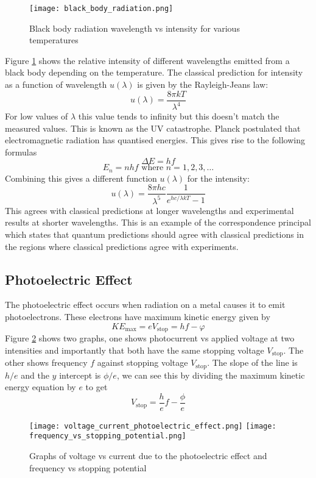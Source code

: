 \documentclass{article}
\begin{document}
    \begin{figure}[ht]
        \centering
        \texttt{[image: black\_body\_radiation.png]}
        \caption{Black body radiation wavelength vs intensity for various temperatures}
        \label{fig:black body wavelength vs frequency}
    \end{figure}
    Figure \ref{fig:black body wavelength vs frequency} shows the relative intensity of different wavelengths emitted from a black body depending on the temperature.
    The classical prediction for intensity as a function of wavelength \(u(\lambda)\) is given by the Rayleigh-Jeans law:
    \[u(\lambda) = \frac{8\pi kT}{\lambda^4}\]
    For low values of \(\lambda\) this value tends to infinity but this doesn't match the measured values.
    This is known as the UV catastrophe.
    Planck postulated that electromagnetic radiation has quantised energies.
    This gives rise to the following formulas
    \[\Delta E = hf\]
    \[E_n = nhf\text{ where }n=1,2,3,\dotsc\]
    Combining this gives a different function \(u(\lambda)\) for the intensity:
    \[u(\lambda)=\frac{8\pi hc}{\lambda^5}\frac{1}{e^{hc/\lambda kT} - 1}\]
    This agrees with classical predictions at longer wavelengths and experimental results at shorter wavelengths.
    This is an example of the correspondence principal which states that quantum predictions should agree with classical predictions in the regions where classical predictions agree with experiments.
    
    \subsection{Photoelectric Effect}
    The photoelectric effect occurs when radiation on a metal causes it to emit photoelectrons.
    These electrons have maximum kinetic energy given by
    \[KE_\text{max} = eV_\text{stop} = hf - \varphi\]
    Figure \ref{fig:photoelectric effect graphs} shows two graphs, one shows photocurrent vs applied voltage at two intensities and importantly that both have the same stopping voltage \(V_\text{stop}\). The other shows frequency \(f\) against stopping voltage \(V_\text{stop}\).
    The slope of the line is \(h/e\) and the \(y\) intercept is \(\phi/e\), we can see this by dividing the maximum kinetic energy equation by \(e\) to get
    \[V_\text{stop} = \frac{h}{e}f - \frac{\phi}{e}\]

    \begin{figure}[ht]
        \centering
        \texttt{[image: voltage\_current\_photoelectric\_effect.png]}
        \texttt{[image: frequency\_vs\_stopping\_potential.png]}
        \caption{Graphs of voltage vs current due to the photoelectric effect and frequency vs stopping potential}
        \label{fig:photoelectric effect graphs}
    \end{figure}
    
\end{document}
